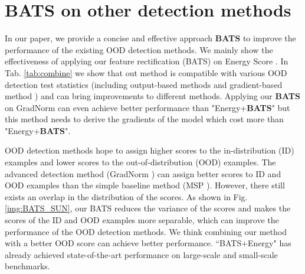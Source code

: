 \documentclass{article}
\begin{document}
\section{BATS on other detection methods}\label{App:combine}
In our paper, we provide a concise and effective approach \textbf{BATS} to improve the performance of the existing OOD detection methods.
We mainly show the effectiveness of applying our feature rectification (BATS) on Energy Score \cite{liu2020energy}. In Tab. \ref{tab:combine} we show that out method is compatible with various OOD detection test statistics (including output-based methods \cite{hendrycks17baseline,liu2020energy,ODIN} and gradient-based method \cite{huang2021importance}) and can bring improvements to different methods. Applying our \textbf{BATS} on GradNorm can even achieve better performance than "Energy+\textbf{BATS}" but this method needs to derive the gradients of the model which cost more than "Energy+\textbf{BATS}".

{
OOD detection methods hope to assign higher scores to the in-distribution (ID) examples and lower scores to the out-of-distribution (OOD) examples. The advanced detection method (GradNorm \cite{huang2021importance}) can assign better scores to ID and OOD examples than the simple baseline method (MSP \cite{hendrycks17baseline}). However, there still exists an overlap in the distribution of the scores. As shown in Fig. \ref{img:BATS_SUN}, our BATS reduces the variance of the scores and makes the scores of the ID and OOD examples more separable, which can improve the performance of the OOD detection methods. We think combining our method with a better OOD score can achieve better performance. ``BATS+Energy" has already achieved state-of-the-art performance on large-scale and small-scale benchmarks.}
\end{document}
